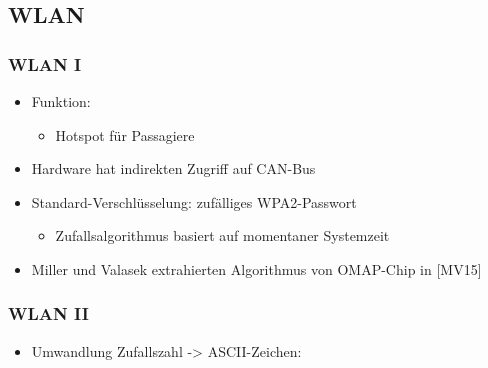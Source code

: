 \documentclass[t]{beamer}
\begin{document}
\subsection{WLAN} %
 \begin{frame}
	\frametitle{WLAN I}
    \begin{itemize}
		\item Funktion:
        \begin{itemize}
			\item Hotspot für Passagiere
		\end{itemize}
    \end{itemize}
    \begin{itemize}
		\item Hardware hat indirekten Zugriff auf CAN-Bus
	\end{itemize}
    \begin{itemize}
		\item Standard-Verschlüsselung: zufälliges WPA2-Passwort
		\begin{itemize}
			\item Zufallsalgorithmus basiert auf momentaner Systemzeit %
		\end{itemize}
	\end{itemize}
    \begin{itemize}
		\item Miller und Valasek extrahierten Algorithmus von OMAP-Chip in [MV15]



	\end{itemize}
\end{frame}

 \begin{frame}
	\frametitle{WLAN II}
    \begin{itemize}
		\item Umwandlung Zufallszahl -> ASCII-Zeichen:
        \end{itemize}
\end{frame}

 \begin{frame}
	\frametitle{WLAN II}
    \begin{itemize}
		\item Umwandlung Zufallszahl -> ASCII-Zeichen:
    \end{itemize}
    }]{wlan-pwd.c}

\end{frame}
\end{document}
